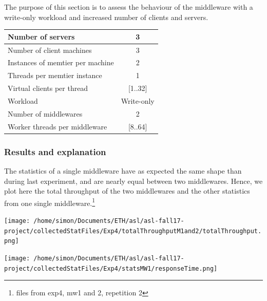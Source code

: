 \documentclass[11pt,a4paper]{article}
\begin{document}
The purpose of this section is to assess the behaviour of the middleware with a write-only workload and increased number of clients and servers.

\begin{center}
	\scriptsize{
		\begin{tabular}{|l|c|}
			\hline Number of servers                & 3          \\ 
			\hline Number of client machines        & 3          \\ 
			\hline Instances of memtier per machine & 2          \\ 
			\hline Threads per memtier instance     & 1          \\
			\hline Virtual clients per thread       & [1..32]    \\ 
			\hline Workload                         & Write-only \\
			\hline Number of middlewares            & 2          \\
			\hline Worker threads per middleware    & [8..64]    \\
			\hline 
		\end{tabular}
	} 
\end{center}

\subsubsection{Results and explanation}

The statistics of a single middleware have as expected the same shape than during last experiment, and are nearly equal between two middlewares. Hence, we plot here the total throughput of the two middlewares and the other statistics from one single middleware.\footnote{files from exp4, mw1 and 2, repetition 2} 

\begin{center}
\texttt{[image: /home/simon/Documents/ETH/asl/asl-fall17-project/collectedStatFiles/Exp4/totalThroughputM1and2/totalThroughput.png]}
\end{center}
 \begin{center}
\texttt{[image: /home/simon/Documents/ETH/asl/asl-fall17-project/collectedStatFiles/Exp4/statsMW1/responseTime.png]}
\end{center}
\end{document}
